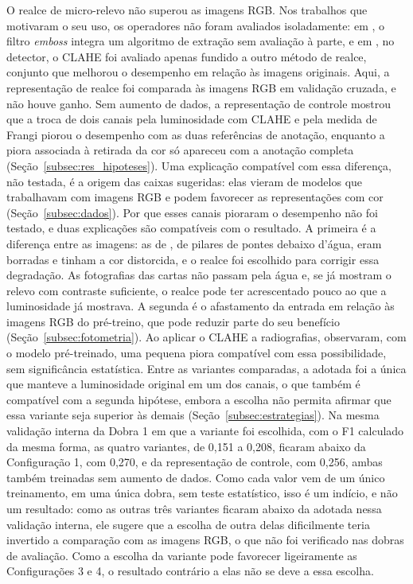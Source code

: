 \documentclass[
    12pt,                %
    openright,           %
    oneside,             %
    a4paper,             %
    english,             %
    brazil               %
]{abntex2}
\begin{document}
O realce de micro-relevo não superou as imagens RGB. Nos trabalhos que
motivaram o seu uso, os operadores não foram avaliados isoladamente: em
, o filtro \textit{emboss} integra um algoritmo de
extração sem avaliação à parte, e em , no detector, o
CLAHE foi avaliado apenas fundido a outro método de realce, conjunto que melhorou
o desempenho em relação às imagens originais. Aqui, a representação de
realce foi comparada às imagens RGB em validação cruzada, e não houve
ganho. Sem aumento de dados, a representação de controle mostrou que a
troca de dois canais pela luminosidade com CLAHE e pela medida de
Frangi piorou o desempenho com as duas referências de anotação,
enquanto a piora associada à retirada da cor só apareceu com a anotação
completa (Seção~\ref{subsec:res_hipoteses}). Uma explicação compatível
com essa diferença, não testada, é a origem das caixas sugeridas: elas
vieram de modelos que trabalhavam com imagens RGB e podem favorecer as
representações com cor (Seção~\ref{subsec:dados}). Por que esses canais pioraram o
desempenho não foi testado, e duas explicações são compatíveis com o
resultado. A primeira é a diferença entre as imagens: as de
, de pilares de pontes debaixo d'água, eram
borradas e tinham a cor distorcida, e o realce foi escolhido para
corrigir essa degradação. As fotografias das cartas não passam pela
água e, se já mostram o relevo com contraste suficiente, o realce pode
ter acrescentado pouco ao que a luminosidade já mostrava. A segunda é o afastamento da entrada em
relação às imagens RGB do pré-treino, que pode reduzir parte do seu
benefício (Seção~\ref{subsec:fotometria}). Ao aplicar o CLAHE a
radiografias,  observaram, com o modelo
pré-treinado, uma pequena piora compatível
com essa possibilidade, sem significância estatística. Entre as variantes
comparadas, a adotada foi a única que manteve a luminosidade original em
um dos canais, o que também é compatível com a segunda hipótese, embora
a escolha não permita afirmar que essa
variante seja superior às demais (Seção~\ref{subsec:estrategias}). Na
mesma validação interna da Dobra 1 em que a variante foi escolhida, com
o F1 calculado da mesma forma, as quatro variantes, de 0,151 a 0,208,
ficaram abaixo da Configuração 1, com 0,270, e da representação de
controle, com 0,256, ambas também treinadas sem aumento de dados. Como
cada valor vem de um único treinamento, em uma única dobra, sem teste
estatístico, isso é um indício, e não um resultado: como as outras três
variantes ficaram abaixo da adotada nessa validação interna, ele sugere
que a escolha de outra delas dificilmente teria invertido a comparação
com as imagens RGB, o que não foi verificado nas dobras de avaliação.
Como a escolha da variante pode favorecer ligeiramente as Configurações 3 e 4, o
resultado contrário a elas não se deve a essa escolha.
\end{document}

